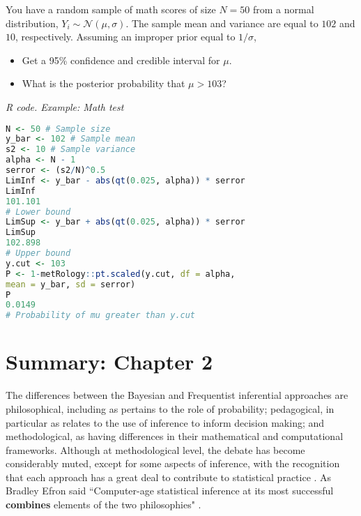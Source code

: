 You have a random sample of math scores of size $N=50$ from a normal distribution, $Y_i\sim \mathcal{N}(\mu, \sigma)$. The sample mean and variance are equal to $102$ and $10$, respectively. Assuming an improper prior equal to $1/\sigma$, 

\begin{itemize}
	\item Get a 95\% confidence and credible interval for $\mu$.
	\item What is the posterior probability that $\mu > 103$?  
\end{itemize}

\begin{tcolorbox}[enhanced,width=4.67in,center upper,
	fontupper=\large\bfseries,drop shadow southwest,sharp corners]
	\textit{R code. Example: Math test}
\begin{VF}
\begin{lstlisting}[basicstyle=\footnotesize, language=R]
N <- 50 # Sample size
y_bar <- 102 # Sample mean
s2 <- 10 # Sample variance
alpha <- N - 1
serror <- (s2/N)^0.5 
LimInf <- y_bar - abs(qt(0.025, alpha)) * serror
LimInf
101.101
# Lower bound
LimSup <- y_bar + abs(qt(0.025, alpha)) * serror
LimSup
102.898
# Upper bound
y.cut <- 103
P <- 1-metRology::pt.scaled(y.cut, df = alpha, 
mean = y_bar, sd = serror)
P
0.0149
# Probability of mu greater than y.cut
\end{lstlisting}
\end{VF}
\end{tcolorbox}



\section{Summary: Chapter 2}\label{sec27}

The differences between the Bayesian and Frequentist inferential approaches are philosophical, including as pertains to the role of probability; pedagogical, in particular as relates to the use of inference to inform decision making; and methodological, as having differences in their mathematical and computational frameworks. Although at methodological level, the debate has become considerably muted, except for some aspects of inference, with the recognition that each approach has a great deal to contribute to statistical practice \cite{Good1992, Bayarri2004, Kass2011}. As Bradley Efron said ``Computer-age statistical inference at its most successful \textbf{combines} elements of the two philosophies" \cite{efron2016computer}.

